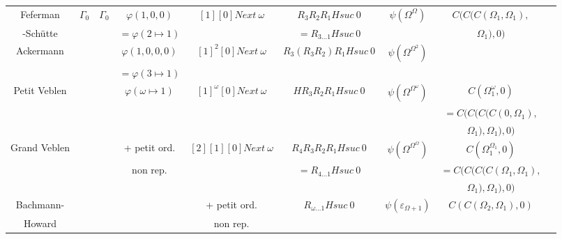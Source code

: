 \documentclass[8pt]{article}
\begin{document}
\begin{tabular}{|c|c|c|c|c|c|c|c|c|}
Feferman	& \(\Gamma_0\)		
								& \(\Gamma_0\)			& \(\varphi(1,0,0)\)		& \([1] [0] Next\ \omega\)	& \(R_3 R_2 R_1 H suc\ 0\) & \(\psi(\Omega^\Omega)\)		& \(C(C(C(\Omega_1,\Omega_1),\) \\ 
-Schütte	&			&				& \(=\varphi(2 \mapsto 1)\)	&				& \(= R_{3 \ldots 1} H suc\ 0\) & 					& \(\Omega_1),0)\)		\\ \hline
Ackermann	&			&				& \(\varphi(1,0,0,0)\)		& \([1]^2 [0] Next\ \omega\) & \(R_3 (R_3 R_2) R_1 H suc\ 0\) & \(\psi(\Omega^{\Omega^2})\)		&				\\ 
		&			&				& \(=\varphi(3 \mapsto 1)\)	&				&			&					&				\\ \hline
Petit Veblen	&			&				& \(\varphi(\omega \mapsto 1)\)	& \([1]^\omega [0] Next\ \omega\) & \(H R_3 R_2 R_1 H suc\ 0\) & \(\psi(\Omega^{\Omega^\omega})\)	& \(C(\Omega_1^\omega,0)\)	\\
		&			&				&				&				&			&					& \(=C(C(C(C(0,\Omega_1), \)	\\ 
		&			&				&				&				&			&					& \(\Omega_1),\Omega_1),0)\)	\\ \hline
Grand Veblen	&			&				& + petit ord.	 	 	& \([2] [1] [0] Next\ \omega\)	& \(R_4 R_3 R_2 R_1 H suc\ 0\) & \(\psi(\Omega^{\Omega^\Omega})\)	& \(C(\Omega_1^{\Omega_1},0)\)	\\
		&			&				& non rep.			&				& \(= R_{4 \ldots 1} H suc\ 0\) &					& \(=C(C(C(C(\Omega_1,\Omega_1),\) \\ 
		&			&				&				&				&			&					& \( \Omega_1),\Omega_1),0) \)	\\ \hline
Bachmann-	&			&				&				& + petit ord.			& \(R_{\omega \ldots 1} H suc\ 0\) & \(\psi(\varepsilon_{\Omega+1})\)	& \(C(C(\Omega_2,\Omega_1),0)\)	\\
Howard		&			&				&				& non rep.			&			&					&				\\ \hline
  
\end{tabular}
\end{document}
